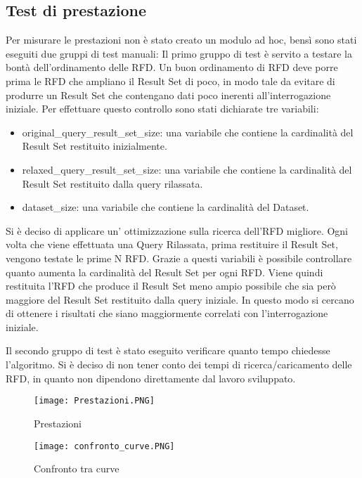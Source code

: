 \subsection{Test di prestazione}
Per misurare le prestazioni non è stato creato un modulo ad hoc, bensì sono stati eseguiti due gruppi di test manuali:
Il primo gruppo di test è servito a testare la bontà dell'ordinamento delle RFD. 
Un buon ordinamento di RFD deve porre prima le RFD che ampliano il Result Set di poco,
in modo tale da evitare di produrre un Result Set che contengano dati poco inerenti all'interrogazione iniziale.
Per effettuare questo controllo sono stati dichiarate tre variabili:
\begin{itemize}
    \item original{\_}query{\_}result{\_}set{\_}size: una variabile che contiene la cardinalità del Result Set restituito inizialmente.
    \item relaxed{\_}query{\_}result{\_}set{\_}size: una variabile che contiene la cardinalità del Result Set restituito dalla query rilassata.
    \item dataset{\_}size: una variabile che contiene la cardinalità del Dataset.
\end{itemize}



Si è deciso di applicare un' ottimizzazione sulla ricerca dell'RFD migliore. 
Ogni volta che viene effettuata una Query Rilassata, prima restituire il Result Set, vengono testate le prime N RFD.
Grazie a questi variabili è possibile controllare quanto aumenta la cardinalità del Result Set per ogni RFD. Viene quindi restituita l'RFD che produce il Result Set meno ampio possibile che sia però maggiore del Result Set restituito dalla query iniziale. In questo modo si cercano di ottenere i risultati che siano maggiormente correlati con l'interrogazione iniziale.

Il secondo gruppo di test è stato eseguito verificare quanto tempo chiedesse l'algoritmo.
Si è deciso di non tener conto dei tempi di ricerca/caricamento delle RFD, in quanto non dipendono direttamente dal lavoro sviluppato.

\begin{figure}[H]
    \centering
    \texttt{[image: Prestazioni.PNG]}
    \caption{Prestazioni}
    \label{fig:prestazioni}
\end{figure}

\begin{figure}[H]
    \centering
    \texttt{[image: confronto\_curve.PNG]}
    \caption{Confronto tra curve}
    \label{fig:confronto_curve}
\end{figure}

